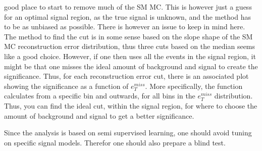 good place to start to remove much of the SM MC. This is however just a guess for an optimal signal region, 
as the true signal is unknown, and the method has to be as unbiased as possible. There is however an issue to keep 
in mind here. The method to find the cut is in some sense based on the slope shape of the SM MC reconstruction 
error distribution, thus three cuts based on the median seems like a good choice. However, if one then uses all 
the events in the signal region, it might be that one misses the ideal amount of background and signal to create 
the significance. Thus, for each reconstruction error cut, there is an associated plot showing the significance 
as a function of $e_T^{miss}$. More specifically, the function calculates from a specific bin and outwards, for all 
bins in the $e_T^{miss}$ distribution. Thus, you can find the ideal cut, within the signal region, for where to 
choose the amount of background and signal to get a better significance.\par 

Since the analysis is based on semi supervised learning, one should avoid tuning on specific signal models.
Therefor one should also prepare a blind test. 
